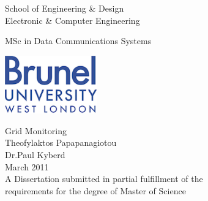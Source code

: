 
\thispagestyle{empty}

\begin{center}
\Large
School of Engineering \& Design\\
Electronic \& Computer Engineering\\
\vspace{1\baselineskip}

MSc in Data Communications Systems\\
\vspace{1\baselineskip}

\begin{center}
\includegraphics[width=40mm]{images/brunel_logo}\\
\end{center}
\vspace{0.5\baselineskip}

\Huge
Grid Monitoring\\
\vspace{1.5\baselineskip}
\Huge
Theofylaktos Papapanagiotou\\
Dr.Paul Kyberd\\
\vspace{1\baselineskip}
\large
March 2011\\
\vspace{0.5\baselineskip}
\large
A Dissertation submitted in partial fulfillment of the\\
requirements for the degree of Master of Science
\end{center}